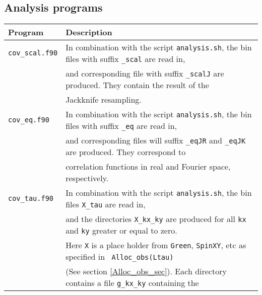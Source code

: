 
\subsection{ Analysis programs }\label{sec:analysis}
%
\begin{table}[h]
  \begin{tabular}{@{} l l @{}}\toprule
   Program & Description \\\midrule
   \texttt{cov\_scal.f90}  &  In combination with the script \texttt{analysis.sh}, the bin files with suffix \texttt{\_scal} are read in, \\
                           & and  corresponding file with suffix \texttt{\_scalJ} are produced. They  contain the  result of the \\
                           & Jackknife resampling.  \\
   \texttt{cov\_eq.f90}    &  In combination with the script \texttt{analysis.sh}, the bin files with suffix \texttt{\_eq} are read in, \\
                           & and   corresponding files will suffix  \texttt{\_eqJR}  and  \texttt{\_eqJK}  are produced. They  correspond to\\
                           & correlation functions in real and Fourier space, respectively.  \\
   \texttt{cov\_tau.f90}   &  In combination with the script \texttt{analysis.sh}, the bin files  \texttt{X\_tau} are read in, \\
                           & and the directories  \texttt{X\_kx\_ky} are produced  for all \texttt{kx} and \texttt{ky} greater or equal to zero. \\
                           & Here \texttt{X}  is a place holder from \texttt{Green}, \texttt{SpinXY}, etc   as specified in \texttt{ Alloc\_obs(Ltau)} \\
                           & (See section \ref{Alloc_obs_sec}). Each directory contains  a  file    \texttt{g\_kx\_ky}  containing the  \\

\end{tabular}
\end{table}
